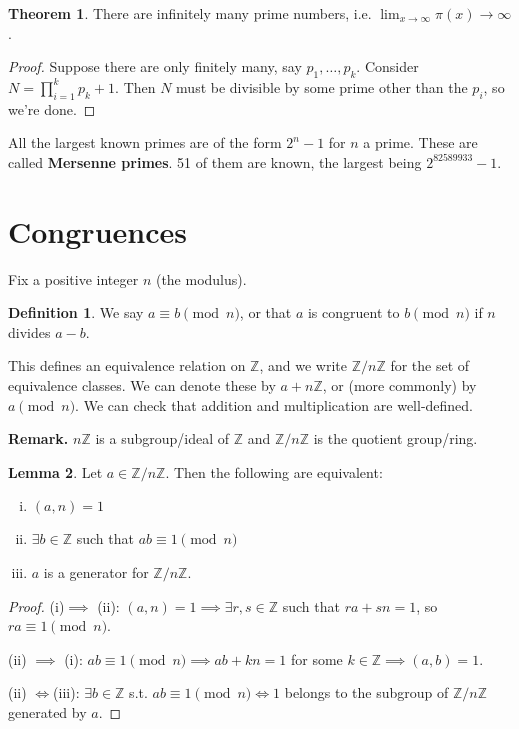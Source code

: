 \documentclass{article}
\theoremstyle{definition}
\newtheorem{theorem}{Theorem}[section]
\newtheorem{lemma}[theorem]{Lemma}
\newtheorem{defn}{Definition}[section]
\begin{document}
\begin{theorem}
    There are infinitely many prime numbers, i.e. ${\lim_{x \to \infty} \pi(x) \to \infty}$.
\end{theorem}
\begin{proof}
    Suppose there are only finitely many, say $p_1,\ldots, p_k$. Consider $N = \prod_{i=1}^{k} p_k + 1$. Then $N$ must be divisible by some prime other than the $p_i$, so we're done.
\end{proof}

All the largest known primes are of the form $2^n-1$ for $n$ a prime. These are called \textbf{Mersenne primes}. 51 of them are known, the largest being $2^{82589933}-1$.


\section{Congruences}

Fix a positive integer $n$ (the modulus).

\begin{defn}
    We say $a \equiv b \pmod{n}$, or that $a$ is congruent to $b \pmod{n}$ if $n$ divides $a-b$. 
\end{defn}

This defines an equivalence relation on $\mathbb{Z}$, and we write $\mathbb{Z}/n\mathbb{Z}$ for the set of equivalence classes. We can denote these by $a + n\mathbb{Z}$, or (more commonly) by ${a \pmod{n}}$. We can check that addition and multiplication are well-defined.

\vspace{1mm}

\textbf{Remark.} $n\mathbb{Z}$ is a subgroup/ideal of $\mathbb{Z}$ and $\mathbb{Z}/n\mathbb{Z}$ is the quotient group/ring.

\begin{lemma}
    Let $a \in \mathbb{Z}/n\mathbb{Z}$. Then the following are equivalent:
    \begin{enumerate}[(i)]
        \item $(a,n) = 1$
        \item $\exists b \in \mathbb{Z}$ such that $ab \equiv 1 \pmod{n}$
        \item $a$ is a generator for $\mathbb{Z}/n\mathbb{Z}$.
    \end{enumerate}
\end{lemma}
\begin{proof}
    (i)$\implies $ (ii): $(a,n)=1 \implies \exists r,s \in \mathbb{Z}$ such that $ra + sn = 1$, so $ra \equiv 1 \pmod{n}$.

    (ii) $\implies $ (i): $ab \equiv 1 \pmod{n} \implies ab + kn = 1$ for some $k \in \mathbb{Z} \implies {(a,b)=1}$.

    (ii) $\iff $(iii): $\exists b \in \mathbb{Z}$ s.t. $ab \equiv 1\pmod{n} \iff 1$ belongs to the subgroup of $\mathbb{Z}/n\mathbb{Z}$ generated by $a$.
\end{proof}
\end{document}

